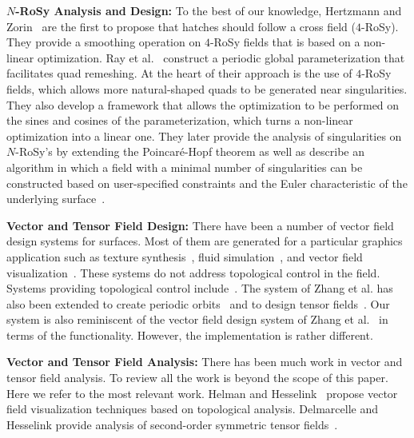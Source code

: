 \documentclass{acmsiggraph}               %
\begin{document}
{\bf $N$-RoSy Analysis and Design:} To the best of our knowledge,
Hertzmann and Zorin~ are the first to
propose that hatches should follow a cross field ($4$-RoSy). They
provide a smoothing operation on $4$-RoSy fields that is based on a
non-linear optimization. Ray et al.~ construct a
periodic global parameterization that facilitates quad remeshing. At
the heart of their approach is the use of $4$-RoSy fields, which
allows more natural-shaped quads to be generated near singularities.
They also develop a framework that allows the optimization to be
performed on the sines and cosines of the parameterization, which
turns a non-linear optimization into a linear one. They later
provide the analysis of singularities on $N$-RoSy's by extending the
Poincar\'e-Hopf theorem as well as describe an algorithm in which a
field with a minimal number of singularities can be constructed
based on user-specified constraints and the Euler characteristic of
the underlying surface~\cite{ray:07}.

{\bf Vector and Tensor Field Design:} There have been a number of
vector field design systems for surfaces. Most of them are generated
for a particular graphics application such as texture
synthesis~\cite{Praun:00,Turk:01,Wei:01}, fluid
simulation~\cite{Stam:03}, and vector field
visualization~\cite{vanWijk:02,vanWijk:03}. These systems do not
address topological control in the field. Systems providing
topological control include~\cite{Theisel:02,Zhang:06}. The system
of Zhang et al. has also been extended to create periodic
orbits~\cite{Chen:07} and to design tensor fields~\cite{Zhang:07}.
Our system is also reminiscent of the vector field design system of
Zhang et al.~ in terms of the functionality.
However, the implementation is rather different.

{\bf Vector and Tensor Field Analysis:} There has been much work in
vector and tensor field analysis. To review all the work is beyond
the scope of this paper. Here we refer to the most relevant work.
Helman and Hesselink~ propose vector field
visualization techniques based on topological analysis. Delmarcelle
and Hesselink provide analysis of second-order symmetric tensor
fields~.

\end{document}
